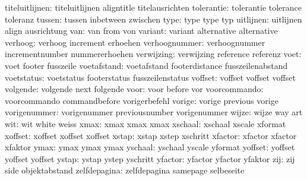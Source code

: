      titeluitlijnen:  titeluitlijnen       aligntitle          titelausrichten
         tolerantie:  tolerantie           tolerance           toleranz
             tussen:  tussen               inbetween           zwischen
               type:  type                 type                typ
          uitlijnen:  uitlijnen            align               ausrichtung
                van:  van                  from                von
            variant:  variant              alternative         alternative
            verhoog:  verhoog              increment           erhoehen
      verhoognummer:  verhoognummer        incrementnumber     nummererhoehen
         verwijzing:  verwijzing           reference           referenz
               voet:  voet                 footer              fusszeile
        voetafstand:  voetafstand          footerdistance      fusszeilenabstand
         voetstatus:  voetstatus           footerstatus        fusszeilenstatus
            voffset:  voffset              voffset             voffset
           volgende:  volgende             next                folgende
               voor:  voor                 before              vor
       voorcommando:  voorcommando         commandbefore       vorigerbefehl
             vorige:  vorige               previous            vorige
       vorigenummer:  vorigenummer         previousnumber      vorigenummer
              wijze:  wijze                way                 art
                wit:  wit                  white               weiss
               xmax:  xmax                 xmax                xmax
            xschaal:  xschaal              xscale              xformat 
            xoffset:  xoffset              xoffset             xoffset
              xstap:  xstap                xstep               xschritt
            xfactor:  xfactor              xfactor             xfaktor
               ymax:  ymax                 ymax                ymax
            yschaal:  yschaal              yscale              yformat
            yoffset:  yoffset              yoffset             yoffset
              ystap:  ystap                ystep               yschritt
            yfactor:  yfactor              yfactor             yfaktor 
                zij:  zij                  side                objektabstand
       zelfdepagina:  zelfdepagina         samepage            selbeseite

\stopconstants




